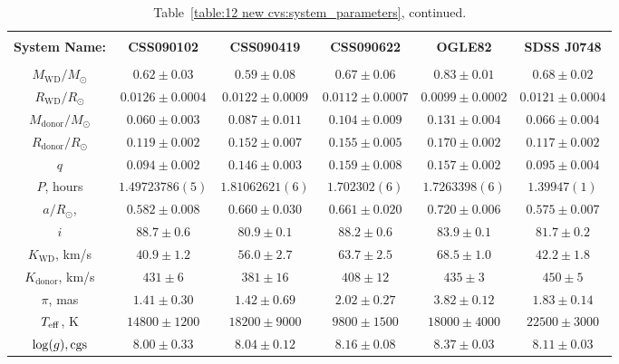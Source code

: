 \begin{landscape}
    \begin{table}
        \centering
        \caption{Table~\ref{table:12 new cvs:system_parameters}, continued.}
        \label{table:12 new cvs:system_parameters cont 1}
        \begin{tabular}{cccccc}
            \hline \\
            \textbf{System Name:}      & \textbf{CSS090102}     & \textbf{CSS090419}    & \textbf{CSS090622}    & \textbf{OGLE82}   & \textbf{SDSS J0748} \\
            \hline \hline \\
            $M_\mathrm{WD}/M_\odot$    & $0.62\pm0.03$          & $0.59\pm0.08$         & $0.67\pm0.06$         & $0.83\pm0.01$     & $0.68\pm0.02$ \\
            $R_\mathrm{WD}/R_\odot$    & $0.0126\pm0.0004$      & $0.0122\pm0.0009$     & $0.0112\pm0.0007$     & $0.0099\pm0.0002$ & $0.0121\pm0.0004$ \\
            $M_\mathrm{donor}/M_\odot$ & $0.060\pm0.003$        & $0.087\pm0.011$       & $0.104\pm0.009$       & $0.131\pm0.004$   & $0.066\pm0.004$ \\
            $R_\mathrm{donor}/R_\odot$ & $0.119\pm0.002$        & $0.152\pm0.007$       & $0.155\pm0.005$       & $0.170\pm0.002$   & $0.117\pm0.002$ \\
            $q$                        & $0.094\pm0.002$        & $0.146\pm0.003$       & $0.159\pm0.008$       & $0.157\pm0.002$   & $0.095\pm0.004$ \\
            \hline
            $P$, hours                 & $1.49723786(5)$        & $1.81062621(6)$       & $1.702302(6)$         & $1.7263398(6)$    & $1.39947(1)$ \\
            $a/R_\odot$,               & $0.582\pm0.008$        & $0.660\pm0.030$       & $0.661\pm0.020$       & $0.720\pm0.006$   & $0.575\pm0.007$ \\
            $i$                        & $88.7\pm0.6$           & $80.9\pm0.1$          & $88.2\pm0.6$          & $83.9\pm0.1$      & $81.7\pm0.2$ \\
            $K_\mathrm{WD}$, km/s      & $40.9\pm1.2$           & $56.0\pm2.7$          & $63.7\pm2.5$          & $68.5\pm1.0$      & $42.2\pm1.8$ \\
            $K_\mathrm{donor}$, km/s   & $431\pm6$              & $381\pm16$            & $408\pm12$            & $435\pm3$         & $450\pm5$ \\
            \hline
            $\pi$, mas                 & $1.41\pm0.30$          & $1.42\pm0.69$         & $2.02\pm0.27$         & $3.82\pm0.12$     & $1.83\pm0.14$ \\
            $T_{\rm eff}$, K           & $14800\pm1200$         & $18200\pm9000$        & $9800\pm1500$         & $18000\pm4000$    & $22500\pm3000$ \\
            $\log(g), {\rm cgs}$       & $8.00\pm0.33$          & $8.04\pm0.12$         & $8.16\pm0.08$         & $8.37\pm0.03$     & $8.11\pm0.03$ \\
            \hline
            \hline
        \end{tabular}
    \end{table}


\end{landscape}
